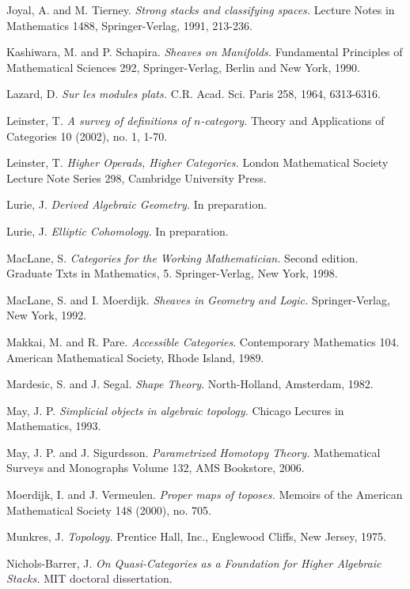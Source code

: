 \documentclass[12pt, final]{report}
\theoremstyle{definition}
\begin{document}
\begin{thebibliography}{99}
 Joyal, A. and M. Tierney. {\it Strong stacks and classifying spaces.} 
Lecture Notes in Mathematics 1488, Springer-Verlag, 1991, 213-236.

 Kashiwara, M. and P. Schapira. {\it Sheaves on Manifolds.} Fundamental Principles of Mathematical Sciences 292, Springer-Verlag, Berlin and New York, 1990. 

 Lazard, D. {\it Sur les modules plats.} C.R.
Acad. Sci. Paris 258, 1964, 6313-6316.

 Leinster, T. {\it A survey of definitions of $n$-category.} Theory and Applications of Categories 10 (2002), no. 1, 1-70.

 Leinster, T. {\it Higher Operads, Higher Categories.} London Mathematical Society Lecture Note Series 298, Cambridge University Press.

 Lurie, J. {\it Derived Algebraic Geometry.} In preparation.

 Lurie, J. {\it Elliptic Cohomology.} In preparation.

 MacLane, S. {\it Categories for the Working Mathematician.} Second edition. Graduate Txts in Mathematics, 5. Springer-Verlag, New York, 1998.

 MacLane, S. and I. Moerdijk. {\it Sheaves in Geometry and Logic.} Springer-Verlag, New York, 1992.

 Makkai, M. and R. Pare. {\it Accessible Categories}.
Contemporary Mathematics 104. American Mathematical Society, Rhode
Island, 1989.

 Mardesic, S. and J. Segal. {\it Shape Theory}.
North-Holland, Amsterdam, 1982.

 May, J. P. {\it Simplicial objects in algebraic topology.} Chicago Lecures in Mathematics, 1993.

 May, J. P. and J. Sigurdsson. {\it Parametrized Homotopy Theory.} Mathematical Surveys and Monographs Volume 132, AMS Bookstore, 2006.

 Moerdijk, I. and J. Vermeulen. {\it Proper maps of toposes.} Memoirs of the American Mathematical Society 148 (2000), no. 705.

 Munkres, J. {\it Topology.} Prentice Hall,
Inc., Englewood Cliffs, New Jersey, 1975.

 Nichols-Barrer, J. {\it On Quasi-Categories as a Foundation for Higher Algebraic Stacks.} MIT doctoral dissertation.


\end{thebibliography}
\end{document}
